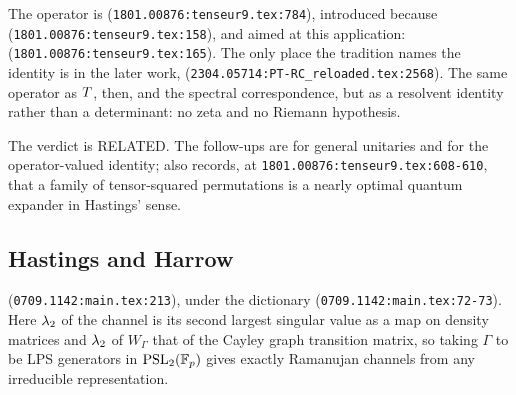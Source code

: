 \begin{citedfact}
\label{cit:bc-nonbacktracking}
\sloppy
The operator is
{\small\texttt{}}
(\texttt{1801.00876:tenseur9.tex:784}), introduced because
{\small\texttt{}}
(\texttt{1801.00876:tenseur9.tex:158}), and aimed at this application:
{\small\texttt{}}
(\texttt{1801.00876:tenseur9.tex:165}). The only place the tradition names
the identity is in the later work,
{\small\texttt{}}
(\texttt{2304.05714:PT-RC\_reloaded.tex:2568}). The same operator as $T$,
then, and the spectral correspondence, but as a resolvent identity rather
than a determinant: no zeta and no Riemann hypothesis.
\end{citedfact}

The verdict is RELATED. The follow-ups are \cite{bordenave2024strong} for
general unitaries and \cite{bordenave2023norm} for the operator-valued
identity; \cite{bordenave2019lifts} also records, at
\texttt{1801.00876:tenseur9.tex:608-610}, that a family of tensor-squared
permutations is a nearly optimal quantum expander in Hastings' sense.

\subsection{Hastings and Harrow}

\begin{citedfact}
\label{cit:harrow-transfer}
\sloppy
{\small\texttt{}}
(\texttt{0709.1142:main.tex:213}), under the dictionary
{\small\texttt{}}
(\texttt{0709.1142:main.tex:72-73}). Here $\lambda_2$ of the channel is its
second largest singular value as a map on density matrices and $\lambda_2$ of
$W_\Gamma$ that of the Cayley graph transition matrix, so taking $\Gamma$ to
be LPS generators in $\mathrm{PSL}_2(\mathbb F_p)$ gives exactly Ramanujan channels from any
irreducible representation.
\end{citedfact}

